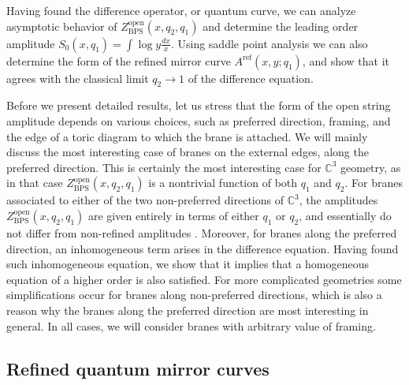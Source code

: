 \documentclass[hyper,letterpaper]{JHEP3}
\newcommand{\C}{{\mathbb C}}
\begin{document}
Having found the difference operator, or quantum curve, we can analyze asymptotic behavior of $Z_{\text{BPS}}^{\text{open}} (x,q_2,q_1)$ and determine the leading order amplitude $S_0(x,q_1)=\int \log y \frac{dx}{x}$. Using saddle point analysis we can also determine the form of the refined mirror curve $A^{\text{ref}} (x,y;q_1)$, and show that it agrees with the classical limit $q_2\to 1$ of the difference equation.

Before we present detailed results, let us stress that the form of the open string amplitude depends on various choices, such as preferred direction, framing, and the edge of a toric diagram to which the brane is attached. We will mainly discuss the most interesting case of branes on the external edges, along the preferred direction. This is certainly the most interesting case for $\C^3$ geometry, as in that case $Z_{\text{BPS}}^{\text{open}} (x,q_2,q_1)$ is a nontrivial function of both $q_1$ and $q_2$. For branes associated to either of the two non-preferred directions of $\C^3$, the amplitudes $Z_{\text{BPS}}^{\text{open}} (x,q_2,q_1)$ are given entirely in terms of either $q_1$ or $q_2$, and essentially do not differ from non-refined amplitudes \cite{Iqbal:2007ii}. Moreover, for branes along the preferred direction, an inhomogeneous term arises in the difference equation. Having found such inhomogeneous equation, we show that it implies that a homogeneous equation of a higher order is also satisfied. For more complicated geometries some simplifications occur for branes along non-preferred directions, which is also a reason why the branes along the preferred direction are most interesting in general. In all cases, we will consider branes with arbitrary value of framing.




\subsection{Refined quantum mirror curves}
\end{document}
